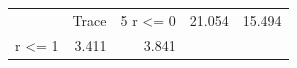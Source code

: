 \begin{tabular}{lrr}
\toprule
 & Trace & 5%
\midrule
r <= 0 & 21.054 & 15.494 \\
r <= 1 & 3.411 & 3.841 \\
\bottomrule
\end{tabular}
